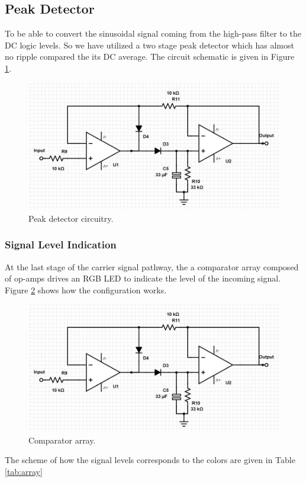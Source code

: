 \documentclass[a4paper,10pt]{IEEEtran}
\begin{document}
\subsection{Peak Detector}
To be able to convert the sinusoidal signal coming from the high-pass filter to the DC logic levels. So we have utilized a two stage peak detector which has almost no ripple compared the its DC average. The circuit schematic is given in Figure \ref{peak}.
\begin{figure}[htbp!]
    \centering
    \includegraphics[width = 1\linewidth]{Peak Detector.jpg}
    \caption{Peak detector circuitry.}
    \label{peak}
\end{figure} 
\subsubsection{Signal Level Indication}
At the last stage of the carrier signal pathway, the a comparator array composed of op-amps drives an RGB LED to indicate the level of the incoming signal. Figure \ref{array} shows how the configuration works.
\begin{figure}[htbp!]
    \centering
    \includegraphics[width = 1\linewidth]{Peak Detector.jpg}
    \caption{Comparator array.}
    \label{array}
\end{figure}
The scheme of how the signal levels corresponds to the colors are given in Table \ref{tab:array}
\end{document}
